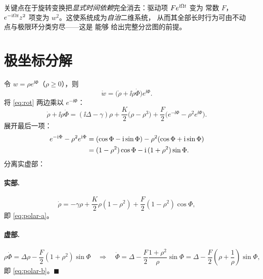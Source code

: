 \begin{remark}
关键点在于旋转变换把\emph{显式时间依赖}完全消去：驱动项 $Fe^{\mathrm{i}\Omega t}$ 变为
常数 $F$，$e^{-\mathrm{i}\Omega t}z^2$ 项变为 $w^2$。这使系统成为\emph{自治}二维系统，
从而其全部长时行为可由不动点与极限环分类穷尽——这是 \citet{Childs2008} 能够
给出完整分岔图的前提。
\end{remark}

\section{极坐标分解}
\label{app:polar}

令 $w=\rho e^{\ii\Phi}$（$\rho\ge0$），则
%
\begin{equation}
\dot w=\bigl(\dot\rho+\ii\rho\dot\Phi\bigr)e^{\ii\Phi}.
\end{equation}
%
将 \cref{eq:rot} 两边乘以 $e^{-\ii\Phi}$：
%
\begin{equation}
\dot\rho+\ii\rho\dot\Phi
=(\ii\Delta-\gamma)\rho
+\frac{K}{2}\bigl(\rho-\rho^{3}\bigr)
+\frac{F}{2}\bigl(e^{-\ii\Phi}-\rho^{2}e^{\ii\Phi}\bigr).
\end{equation}
%
展开最后一项：
%
\begin{align}
e^{-\mathrm{i}\Phi}-\rho^{2}e^{\mathrm{i}\Phi}
&=(\cos\Phi-\mathrm{i}\sin\Phi)-\rho^{2}(\cos\Phi+\mathrm{i}\sin\Phi)\notag\\
&=(1-\rho^{2})\cos\Phi-\mathrm{i}\,(1+\rho^{2})\sin\Phi .
\label{eq:app-expand}
\end{align}
%
分离实虚部：

\paragraph{实部.}
\begin{equation}
\dot\rho=-\gamma\rho+\frac{K}{2}\rho(1-\rho^{2})
         +\frac{F}{2}(1-\rho^{2})\cos\Phi ,
\end{equation}
即 \cref{eq:polar-a}。

\paragraph{虚部.}
\begin{equation}
\rho\dot\Phi=\Delta\rho-\frac{F}{2}(1+\rho^{2})\sin\Phi
\quad\Longrightarrow\quad
\dot\Phi=\Delta-\frac{F}{2}\frac{1+\rho^{2}}{\rho}\sin\Phi
        =\Delta-\frac{F}{2}\left(\rho+\frac{1}{\rho}\right)\sin\Phi ,
\end{equation}
即 \cref{eq:polar-b}。\hfill$\blacksquare$

